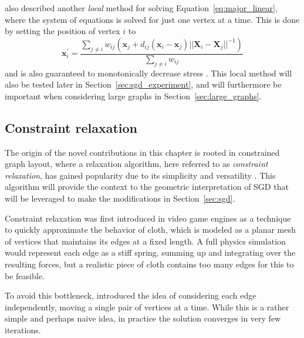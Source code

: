 \citet{Gansner2004} also described another \emph{local} method for solving Equation~\ref{eq:major_linear}, where the system of equations is solved for just one vertex at a time. This is done by setting the position of vertex $i$ to
\begin{equation}
  \mathbf{x}_i^\prime = \frac{\sum_{j\neq i}w_{ij}(\mathbf{x}_j + d_{ij}(\mathbf{x}_i - \mathbf{x}_j)||\mathbf{X}_i - \mathbf{X}_j||^{-1})}{\sum_{j\neq i}w_{ij}}
  \label{eq:major_local}
\end{equation}
and is also guaranteed to monotonically decrease stress \citep{Gansner2004}. This local method will also be tested later in Section~\ref{sec:sgd_experiment}, and will furthermore be important when considering large graphs in Section~\ref{sec:large_graphs}.

\subsection{Constraint relaxation}
\label{sec:wcr_story}
The origin of the novel contributions in this chapter is rooted in constrained graph layout, where a relaxation algorithm, here referred to as \emph{constraint relaxation}, has gained popularity due to its simplicity and versatility \citep{Dwyer2009,Bostock2011}. This algorithm will provide the context to the geometric interpretation of SGD that will be leveraged to make the modifications in Section~\ref{sec:sgd}.

Constraint relaxation was first introduced in video game engines as a technique to quickly approximate the behavior of cloth, which is modeled as a planar mesh of vertices that maintains its edges at a fixed length.
A full physics simulation would represent each edge as a stiff spring, summing up and integrating over the resulting forces, but a realistic piece of cloth contains too many edges for this to be feasible.

To avoid this bottleneck, \citet{Jakobsen2001} introduced the idea of considering each edge independently, moving a single pair of vertices at a time.
While this is a rather simple and perhaps naive idea, in practice the solution converges in very few iterations.

